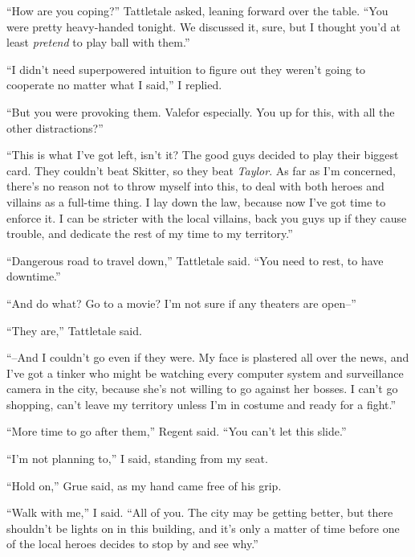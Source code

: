 ``How are you coping?'' Tattletale asked, leaning forward over the table.  ``You were pretty heavy-handed tonight.  We discussed it, sure, but I thought you'd at least \emph{pretend} to play ball with them.''



``I didn't need superpowered intuition to figure out they weren't going to cooperate no matter what I said,'' I replied.



``But you were provoking them.  Valefor especially.  You up for this, with all the other distractions?''



``This is what I've got left, isn't it?  The good guys decided to play their biggest card.  They couldn't beat Skitter, so they beat \emph{Taylor}.  As far as I'm concerned, there's no reason not to throw myself into this, to deal with both heroes and villains as a full-time thing.  I lay down the law, because now I've got time to enforce it.  I can be stricter with the local villains, back you guys up if they cause trouble, and dedicate the rest of my time to my territory.''



``Dangerous road to travel down,'' Tattletale said.  ``You need to rest, to have downtime.''



``And do what?  Go to a movie?  I'm not sure if any theaters are open--''



``They are,'' Tattletale said.



``--And I couldn't go even if they were.  My face is plastered all over the news, and I've got a tinker who might be watching every computer system and surveillance camera in the city, because she's not willing to go against her bosses.  I can't go shopping, can't leave my territory unless I'm in costume and ready for a fight.''



``More time to go after them,'' Regent said.  ``You can't let this slide.''



``I'm not planning to,'' I said, standing from my seat.



``Hold on,'' Grue said, as my hand came free of his grip.



``Walk with me,'' I said.  ``All of you.  The city may be getting better, but there shouldn't be lights on in this building, and it's only a matter of time before one of the local heroes decides to stop by and see why.''



